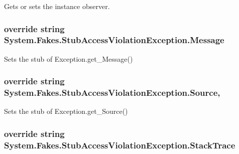 Gets or sets the instance observer.

\hypertarget{class_system_1_1_fakes_1_1_stub_access_violation_exception_a2d838945cede923b572314528ab0b487}{
\subsubsection[{Message}]{\setlength{\rightskip}{0pt plus 5cm}override string System.\-Fakes.\-Stub\-Access\-Violation\-Exception.\-Message\hspace{0.3cm}{\ttfamily [get]}}}\label{class_system_1_1_fakes_1_1_stub_access_violation_exception_a2d838945cede923b572314528ab0b487}


Sets the stub of Exception.\-get\-\_\-\-Message()

\hypertarget{class_system_1_1_fakes_1_1_stub_access_violation_exception_aeb416417305c2c68d704aef1ebb15d59}{
\subsubsection[{Source}]{\setlength{\rightskip}{0pt plus 5cm}override string System.\-Fakes.\-Stub\-Access\-Violation\-Exception.\-Source\hspace{0.3cm}{\ttfamily [get]}, {\ttfamily [set]}}}\label{class_system_1_1_fakes_1_1_stub_access_violation_exception_aeb416417305c2c68d704aef1ebb15d59}


Sets the stub of Exception.\-get\-\_\-\-Source()

\hypertarget{class_system_1_1_fakes_1_1_stub_access_violation_exception_a915a1f7ed2ef7b3ff3a280a5ef5d2478}{
\subsubsection[{Stack\-Trace}]{\setlength{\rightskip}{0pt plus 5cm}override string System.\-Fakes.\-Stub\-Access\-Violation\-Exception.\-Stack\-Trace\hspace{0.3cm}{\ttfamily [get]}}}\label{class_system_1_1_fakes_1_1_stub_access_violation_exception_a915a1f7ed2ef7b3ff3a280a5ef5d2478}


